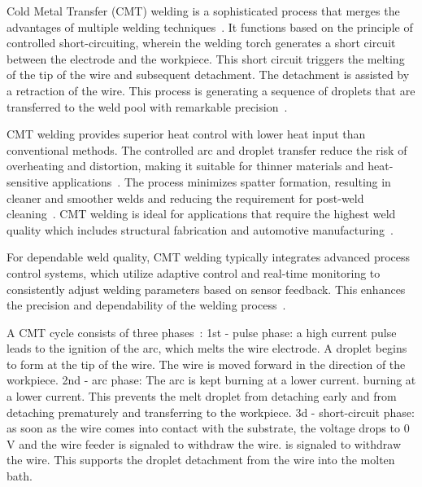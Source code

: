 Cold Metal Transfer (CMT) welding is a sophisticated process that merges the advantages of multiple welding techniques~\cite{Dutra.2015}. It functions based on the principle of controlled short-circuiting, wherein the welding torch generates a short circuit between the electrode and the workpiece. This short circuit triggers the melting of the tip of the wire and subsequent detachment. The detachment is assisted by a retraction of the wire. This process is generating a sequence of droplets that are transferred to the weld pool with remarkable precision~\cite{Selvi.2018, Srinivasan.2022}.

CMT welding provides superior heat control with lower heat input than conventional methods. The controlled arc and droplet transfer reduce the risk of overheating and distortion, making it suitable for thinner materials and heat-sensitive applications~\cite{Scotti.2020}. The process minimizes spatter formation, resulting in cleaner and smoother welds and reducing the requirement for post-weld cleaning~\cite{Srinivasan.2022}. %
CMT welding is ideal for applications that require the highest weld quality which includes structural fabrication and automotive manufacturing~\cite{Cong.2016}.

For dependable weld quality, CMT welding typically integrates advanced process control systems, which utilize adaptive control and real-time monitoring to consistently adjust welding parameters based on sensor feedback. This enhances the precision and dependability of the welding process~\cite{Pickin.2006}.

A CMT cycle consists of three phases~\cite{Selvi.2018}:\newline
1st - pulse phase: a high current pulse leads to the ignition of the arc, 
which melts the wire electrode. A droplet begins to form at the 
tip of the wire. The wire is moved forward in the direction of the 
workpiece.\newline
2nd - arc phase: The arc is kept burning at a lower current. 
burning at a lower current. This prevents the melt droplet from detaching early and 
from detaching prematurely and transferring to the workpiece.\newline
3d - short-circuit phase: as soon as the wire comes into contact with the substrate, 
the voltage drops to 0 V and the wire feeder is signaled to withdraw the wire. 
is signaled to withdraw the wire. This supports the droplet detachment 
from the wire into the molten bath.

